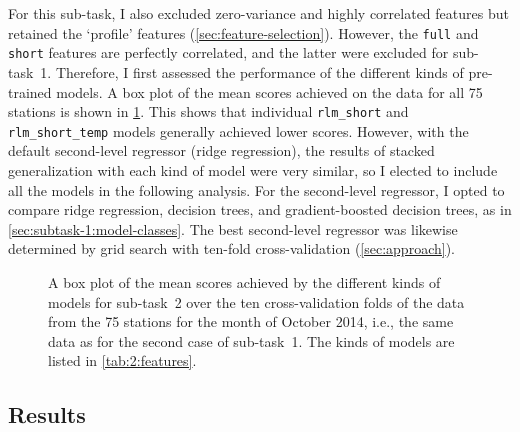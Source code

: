 \documentclass[11pt]{extarticle}
\newcommand{\rlmfull}{\texttt{rlm\_full}}
\newcommand{\rlmfulltemp}{\texttt{rlm\_full\_temp}}
\newcommand{\rlmshort}{\texttt{rlm\_short}}
\newcommand{\rlmshortfull}{\texttt{rlm\_short\_full}}
\newcommand{\rlmshortfulltemp}{\texttt{rlm\_short\_full\_temp}}
\newcommand{\rlmshorttemp}{\texttt{rlm\_short\_temp}}
\begin{document}
For this sub-task, I also excluded zero-variance and highly correlated features but
retained the `profile' features (\cref{sec:feature-selection}).
However, the \texttt{full} and \texttt{short} features are perfectly correlated, and
the latter were excluded for sub-task~1.
Therefore, I first assessed the performance of the different kinds of pre-trained
models.
A box plot of the mean scores achieved on the data for all 75 stations is shown in
\cref{fig:2:box-plot}.
This shows that individual \rlmshort{} and \rlmshorttemp{} models generally achieved
lower scores.
However, with the default second-level regressor (ridge regression), the results of
stacked generalization with each kind of model were very similar, so I elected to
include all the models in the following analysis.
For the second-level regressor, I opted to compare ridge regression, decision trees,
and gradient-boosted decision trees, as in \cref{sec:subtask-1:model-classes}.
The best second-level regressor was likewise determined by grid search with ten-fold
cross-validation (\cref{sec:approach}).

\begin{figure}
  \centering
  \caption{A box plot of the mean scores achieved by the different kinds of models for
    sub-task~2 over the ten cross-validation folds of the data from the 75 stations for
    the month of October 2014, i.e., the same data as for the second case of sub-task~1.
    The kinds of models are listed in \cref{tab:2:features}.
  }
  \label{fig:2:box-plot}
\end{figure}

\subsection{Results}
\label{sec:subtask-2:results}

\printbibliography
\end{document}
